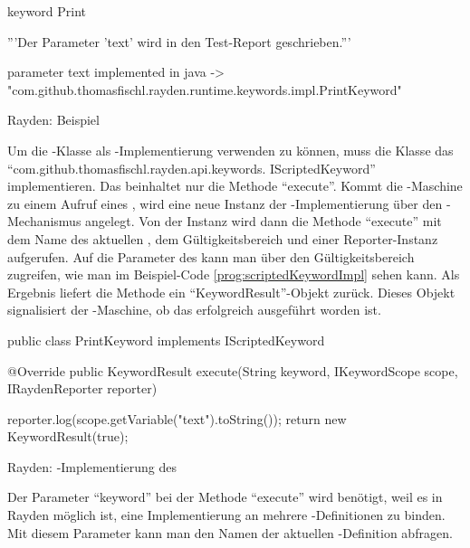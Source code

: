 \begin{program}
\begin{JavaCode}
keyword Print {
	'''Der Parameter 'text' wird in den Test-Report geschrieben.'''
	
	parameter text
	implemented in java -> "com.github.thomasfischl.rayden.runtime.keywords.impl.PrintKeyword"
}
\end{JavaCode}
\caption{Rayden: Beispiel }
\label{prog:scriptedKeyword}
\end{program}

\SuperPar
Um die -Klasse als -Implementierung verwenden zu können, muss die Klasse das  "`com.github.thomasfischl.rayden.api.keywords. IScriptedKeyword"' implementieren. Das  beinhaltet nur die Methode "`execute"'. Kommt die -Maschine zu einem Aufruf eines , wird eine neue Instanz der -Implementierung über den -Mechanismus angelegt. Von der Instanz wird dann die Methode "`execute"' mit dem Name des aktuellen , dem Gültigkeitsbereich und einer Reporter-Instanz aufgerufen. Auf die Parameter des  kann man über den Gültigkeitsbereich zugreifen, wie man im Beispiel-Code \ref{prog:scriptedKeywordImpl} sehen kann. Als Ergebnis liefert die Methode ein "`KeywordResult"'-Objekt zurück. Dieses Objekt signalisiert der -Maschine, ob das  erfolgreich ausgeführt worden ist.   

\begin{program}
\begin{JavaCode}
public class PrintKeyword implements IScriptedKeyword {

	@Override
	public KeywordResult execute(String keyword, 
			IKeywordScope scope, IRaydenReporter reporter) {
			
		reporter.log(scope.getVariable("text").toString());
		return new KeywordResult(true);
	}
}
\end{JavaCode}
\caption{Rayden: -Implementierung des }
\label{prog:scriptedKeywordImpl}
\end{program}

\SuperPar
Der Parameter "`keyword"' bei der Methode "`execute"' wird benötigt, weil es in Rayden möglich ist, eine Implementierung an mehrere -Definitionen zu binden. Mit diesem Parameter kann man den Namen der aktuellen -Definition abfragen.

